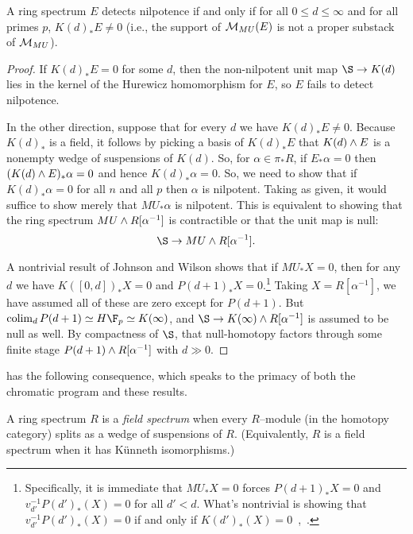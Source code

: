\begin{corollary}\label{LocalNilpotenceDetection}
A ring spectrum $E$ detects nilpotence if and only if for all $0 \le d \le \infty$ and for all primes $p$, $K(d)_* E \ne 0$ (i.e., the support of $\mathcal{M}_{MU}(E)$ is not a proper substack of $\mathcal{M}_{MU}$).
\end{corollary}
\begin{proof}
If $K(d)_* E = 0$ for some $d$, then the non-nilpotent unit map $\S \to K(d)$ lies in the kernel of the Hurewicz homomorphism for $E$, so $E$ fails to detect nilpotence.

In the other direction, suppose that for every $d$ we have $K(d)_* E \ne 0$.  Because $K(d)_*$ is a field, it follows by picking a basis of $K(d)_* E$ that $K(d) \wedge E$ is a nonempty wedge of suspensions of $K(d)$.  So, for $\alpha \in \pi_* R$, if $E_* \alpha = 0$ then $(K(d) \wedge E)_* \alpha = 0$ and hence $K(d)_* \alpha = 0$.  So, we need to show that if $K(d)_* \alpha = 0$ for all $n$ and all $p$ then $\alpha$ is nilpotent.  Taking  as given, it would suffice to show merely that $MU_* \alpha$ is nilpotent.  This is equivalent to showing that the ring spectrum $MU \wedge R[\alpha^{-1}]$ is contractible or that the unit map is null: \[\S \to MU \sm R[\alpha^{-1}].\]

A nontrivial result of Johnson and Wilson shows that if $MU_* X = 0$, then for any $d$ we have $K([0, d])_* X = 0$ and $P(d+1)_* X = 0$.\footnote{Specifically, it is immediate that $MU_* X = 0$ forces $P(d+1)_* X = 0$ and $v_{d'}^{-1} P(d')_*(X) = 0$ for all $d' < d$.  What's nontrivial is showing that $v_{d'}^{-1} P(d')_*(X) = 0$ if and only if $K(d')_*(X) = 0$~\cite[Theorem 2.1.a]{RavenelLocalizationWRTPeriodic},~\cite[Section 3]{JohnsonWilson}.}  Taking $X = R[\alpha^{-1}]$, we have assumed all of these are zero except for $P(d+1)$.  But $\colim_d P(d+1) \simeq H\F_p \simeq K(\infty)$, and $\S \to K(\infty) \sm R[\alpha^{-1}]$ is assumed to be null as well.  By compactness of $\S$, that null-homotopy factors through some finite stage $P(d+1) \wedge R[\alpha^{-1}]$ with $d \gg 0$.
\end{proof}

 has the following consequence, which speaks to the primacy of both the chromatic program and these results.

\begin{definition}
A ring spectrum $R$ is a \textit{field spectrum} when every $R$--module (in the homotopy category) splits as a wedge of suspensions of $R$.  (Equivalently, $R$ is a field spectrum when it has K\"unneth isomorphisms.)
\end{definition}

